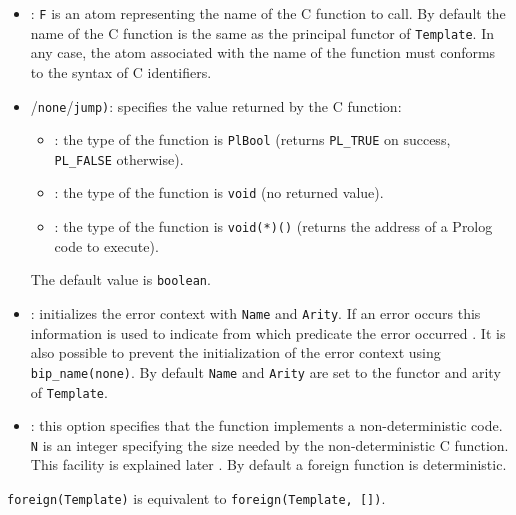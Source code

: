 \begin{itemize}

\item {}: \texttt{F} is an atom representing
the name of the C function to call. By default the name of the C function is
the same as the principal functor of \texttt{Template}. In any case, the atom
associated with the name of the function must conforms to the syntax of C
identifiers.

\item {}/\texttt{none}/\texttt{jump)}:
specifies the value returned by the C function:

\begin{itemize}

\item {}: the type of the function is \texttt{PlBool} (returns
\texttt{PL\_TRUE} on success, \texttt{PL\_FALSE} otherwise).

\item {}: the type of the function is \texttt{void} (no returned
value).

\item {}: the type of the function is \texttt{void(*)()} (returns
the address of a Prolog code to execute).

\end{itemize}

The default value is \texttt{boolean}.

\item {}: initializes the error
context with \texttt{Name} and \texttt{Arity}. If an error occurs this
information is used to indicate from which predicate the error occurred
. It is also possible to prevent the
initialization of the error context using \texttt{bip\_name(none)}. By
default \texttt{Name} and \texttt{Arity} are set to the functor and arity of
\texttt{Template}.

\item {}: this option specifies that the
function implements a non-deterministic code. \texttt{N} is an integer
specifying the size needed by the non-deterministic C function. This facility
is explained later . By default a
foreign function is deterministic.

\end{itemize}

\texttt{foreign(Template)} is equivalent to
\texttt{foreign(Template, [])}.

